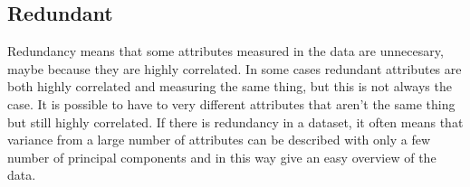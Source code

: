 \subsection*{Redundant}
Redundancy means that some attributes measured in the data are unnecesary, maybe because they are highly correlated. 
In some cases redundant attributes are both highly correlated and measuring the same thing, but this is not always the case. It is possible to have to very different attributes that aren't the same thing but still highly correlated. \blankline
%
If there is redundancy in a dataset, it often means that variance from a large number of attributes can be described with only a few number of principal components and in this way give an easy overview of the data. 